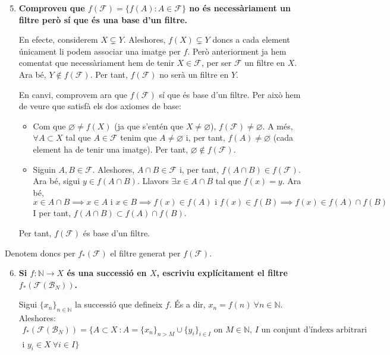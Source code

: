 \documentclass[10pt,a4paper]{article}
\newcommand{\NN}{\ensuremath{\mathbb{N}}}
\begin{document}
\begin{enumerate}\setcounter{enumi}{4}
      \item \textbf{Comproveu que $f(\mathcal{F})=\{f(A):A\in\mathcal{F}\}$ no és necessàriament un filtre però sí que és una base d'un filtre.}

            En efecte, considerem $X \subsetneq Y$. Aleshores, $f(X) \subsetneq Y$ doncs a cada element únicament li podem associar una imatge per $f$. Però anteriorment ja hem comentat que necessàriament hem de tenir $X \in \mathcal{F}$, per ser $\mathcal{F}$ un filtre en $X$. Ara bé, $Y \notin f(\mathcal{F})$. Per tant, $f(\mathcal{F})$ no serà un filtre en $Y$.

            En canvi, comprovem ara que $f(\mathcal{F})$ sí que és base d'un filtre. Per això hem de veure que satisfà els dos axiomes de base:
            \begin{itemize}
                  \item Com que $\varnothing \neq f(X)$ (ja que s'entén que $X\ne\varnothing$), $f(\mathcal{F}) \neq \varnothing$. A més, $\forall A \subset X$ tal que $A \in \mathcal{F}$ tenim que $A\ne\varnothing$ i, per tant, $f(A) \neq \varnothing$ (cada element ha de tenir una imatge). Per tant, $\varnothing \notin f(\mathcal{F})$.
                  \item Siguin $A, B \in \mathcal{F}$. Aleshores, $A \cap B \in \mathcal{F}$ i, per tant, $f(A\cap B) \in f(\mathcal{F})$. Ara bé, sigui $y \in f(A \cap B)$. Llavors $\exists x\in A \cap B$ tal que $f(x)=y$. Ara bé, $$x\in A \cap B\implies x\in A \text{ i } x\in B \implies f(x)\in f(A) \text{ i } f(x) \in f(B) \implies f(x)\in f(A)\cap f(B)$$ I per tant, $f(A\cap B) \subset f(A)\cap f(B)$.
            \end{itemize}
            Per tant, $f(\mathcal{F})$ és base d'un filtre.
\end{enumerate}
Denotem doncs per $f_*(\mathcal{F})$ el filtre generat per $f(\mathcal{F})$.
\begin{enumerate}\setcounter{enumi}{5}
      \item \textbf{Si $f:\NN\rightarrow X$ és una successió en $X$, escriviu explícitament el filtre $f_*(\mathcal{F}(\mathcal{B}_N))$.}

            Sigui $\{x_n\}_{n\in\NN}$ la successió que defineix $f$. És a dir, $x_n=f(n)\ \forall n\in\NN$. Aleshores:
            \begin{multline}\label{f*}
                  f_*(\mathcal{F}(\mathcal{B}_N))=\{A\subset X \ : A=\{x_n\}_{n>M}\cup\{y_i\}_{i\in I}\text{ on $M\in\NN$, $I$ un conjunt d'índexs arbitrari}\\\text{i $y_i\in X\ \forall i\in I$}\}
            \end{multline}
\end{enumerate}
\end{document}
